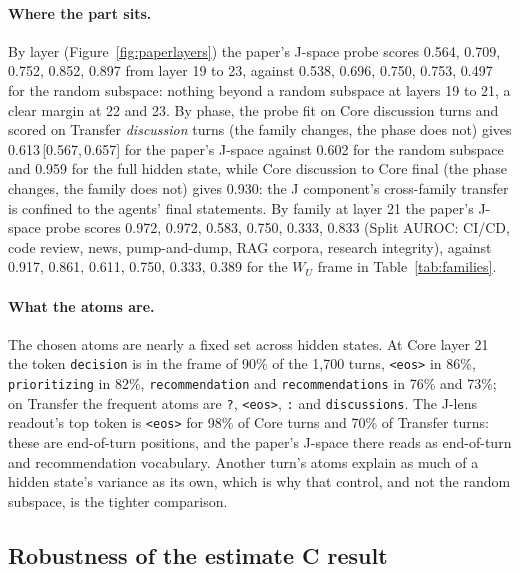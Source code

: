 \documentclass[11pt,a4paper]{article}
\newcommand{\ci}[3]{#1\,[#2,\,#3]}
\newcommand{\WU}{W_U}
\begin{document}
\paragraph{Where the part sits.} By layer (Figure~\ref{fig:paperlayers}) the paper's J-space probe scores 0.564, 0.709, 0.752, 0.852, 0.897 from layer 19 to 23, against 0.538, 0.696, 0.750, 0.753, 0.497 for the random subspace: nothing beyond a random subspace at layers 19 to 21, a clear margin at 22 and 23. By phase, the probe fit on Core discussion turns and scored on Transfer \emph{discussion} turns (the family changes, the phase does not) gives \ci{0.613}{0.567}{0.657} for the paper's J-space against 0.602 for the random subspace and 0.959 for the full hidden state, while Core discussion to Core final (the phase changes, the family does not) gives 0.930: the J component's cross-family transfer is confined to the agents' final statements. By family at layer 21 the paper's J-space probe scores 0.972, 0.972, 0.583, 0.750, 0.333, 0.833 (Split AUROC: CI/CD, code review, news, pump-and-dump, RAG corpora, research integrity), against 0.917, 0.861, 0.611, 0.750, 0.333, 0.389 for the $\WU$ frame in Table~\ref{tab:families}.

\paragraph{What the atoms are.} The chosen atoms are nearly a fixed set across hidden states. At Core layer 21 the token \texttt{decision} is in the frame of 90\% of the 1,700 turns, \texttt{<eos>} in 86\%, \texttt{prioritizing} in 82\%, \texttt{recommendation} and \texttt{recommendations} in 76\% and 73\%; on Transfer the frequent atoms are \texttt{?}, \texttt{<eos>}, \texttt{:} and \texttt{discussions}. The J-lens readout's top token is \texttt{<eos>} for 98\% of Core turns and 70\% of Transfer turns: these are end-of-turn positions, and the paper's J-space there reads as end-of-turn and recommendation vocabulary. Another turn's atoms explain as much of a hidden state's variance as its own, which is why that control, and not the random subspace, is the tighter comparison.

\subsection{Robustness of the estimate C result}
\label{sec:variants}
\end{document}
